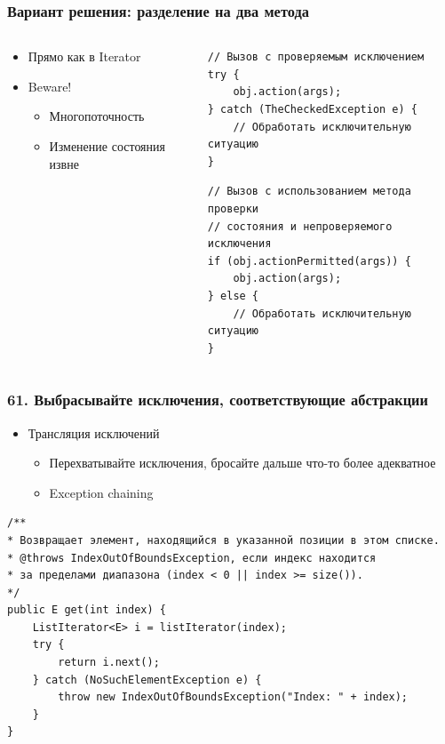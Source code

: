 \documentclass[xetex,mathserif,serif]{beamer}
\begin{document}
	\begin{frame}[fragile]
		\frametitle{Вариант решения: разделение на два метода}
		\begin{columns}
			\begin{column}{0.4\textwidth}
				\begin{itemize}
					\item Прямо как в Iterator
					\item Beware!
					\begin{itemize}
						\item Многопоточность
						\item Изменение состояния извне
					\end{itemize}
				\end{itemize}
			\end{column}
			\begin{column}{0.6\textwidth}
				\begin{footnotesize}
					\begin{verbatim}
// Вызов с проверяемым исключением
try {
    obj.action(args);
} catch (TheCheckedException e) {
    // Обработать исключительную ситуацию
}
					\end{verbatim}
					\vspace{3mm}
					\begin{verbatim}
// Вызов с использованием метода проверки
// состояния и непроверяемого исключения
if (obj.actionPermitted(args)) {
    obj.action(args);
} else {
    // Обработать исключительную ситуацию
}
					\end{verbatim}
				\end{footnotesize}
			\end{column}
		\end{columns}
	\end{frame}

	\begin{frame}[fragile]
		\frametitle{61. Выбрасывайте исключения, соответствующие абстракции}
		\begin{itemize}
			\item Трансляция исключений
			\begin{itemize}
				\item Перехватывайте исключения, бросайте дальше что-то более адекватное
				\item Exception chaining
			\end{itemize}
		\end{itemize}
		\begin{footnotesize}
			\begin{verbatim}
/**
* Возвращает элемент, находящийся в указанной позиции в этом списке.
* @throws IndexOutOfBoundsException, если индекс находится
* за пределами диапазона (index < 0 || index >= size()).
*/
public E get(int index) {
    ListIterator<E> i = listIterator(index);
    try {
        return i.next();
    } catch (NoSuchElementException e) {
        throw new IndexOutOfBoundsException("Index: " + index);
    }
}
			\end{verbatim}
		\end{footnotesize}
	\end{frame}
\end{document}
